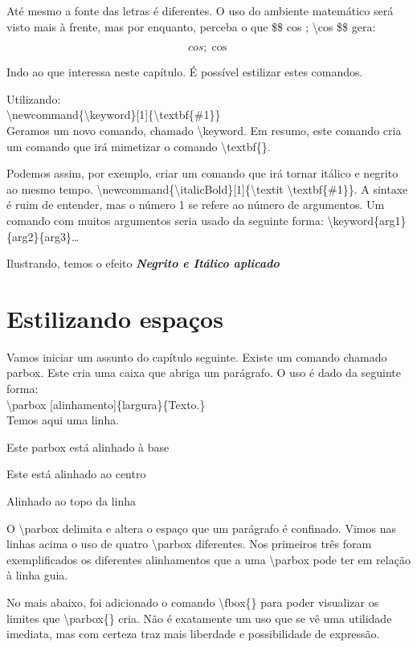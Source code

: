 Até mesmo a fonte das letras é diferentes.
O uso do ambiente matemático será visto mais à frente, mas por enquanto, perceba o que \$\$ cos ; \textbackslash cos \$\$ gera:

$$cos ; \cos$$

Indo ao que interessa neste capítulo.
É possível estilizar estes comandos.

Utilizando:\\
\indent \textbackslash newcommand\{\textbackslash keyword\}[1]\{\textbackslash textbf\{\#1\}\}\\
\indent Geramos um novo comando, chamado \textbackslash keyword.
Em resumo, este comando cria um comando que irá mimetizar o comando \textbackslash textbf\{\}.

Podemos assim, por exemplo, criar um comando que irá tornar itálico e negrito ao mesmo tempo.
\textbackslash newcommand\{\textbackslash italicBold\}[1]\{\textbackslash textit \textbackslash textbf\{\#1\}\}.
A sintaxe é ruim de entender, mas o número 1 se refere ao número de argumentos.
Um comando com muitos argumentos seria usado da seguinte forma: \textbackslash keyword\{arg1\}\{arg2\}\{arg3\}\ldots

\newcommand{\italicBold}[1]{\textit{\textbf{#1}}}
Ilustrando, temos o efeito \italicBold{Negrito e Itálico aplicado}

\section{Estilizando espaços}
Vamos iniciar um assunto do capítulo seguinte.
Existe um comando chamado parbox.
Este cria uma caixa que abriga um parágrafo.
O uso é dado da seguinte forma:\\
\textbackslash parbox [alinhamento]\{largura\}\{Texto.\}
\\

Temos aqui uma linha.
\quad\parbox[b]{2.5cm}{Este parbox está alinhado à base}
\quad\parbox{2.5cm}{Este está alinhado ao centro}
\quad\parbox[t]{2.5cm}{Alinhado ao topo da linha}


O \textbackslash parbox delimita e altera o espaço que um parágrafo é confinado.
Vimos nas linhas acima o uso de quatro \textbackslash parbox diferentes.
Nos primeiros três foram exemplificados os diferentes alinhamentos que a uma \textbackslash parbox pode ter em relação à linha guia.

No mais abaixo, foi adicionado o comando \textbackslash fbox\{\}
para poder visualizar os limites que \textbackslash parbox\{\} cria.
Não é exatamente um uso que se vê uma utilidade imediata,
mas com certeza traz mais liberdade e possibilidade de expressão.

